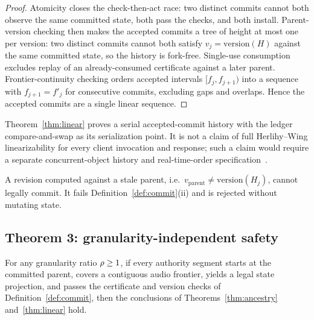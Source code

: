\begin{proof}
Atomicity closes the check-then-act race: two distinct commits cannot both
observe the same committed state, both pass the checks, and both install.
Parent-version checking then makes the accepted commits a tree of height at
most one per version: two distinct commits cannot both satisfy
$v_j = \mathrm{version}(H)$ against the same committed state, so the
history is fork-free. Single-use consumption excludes replay of an
already-consumed certificate against a later parent. Frontier-continuity
checking orders accepted intervals $[f_j,f_{j+1})$ into a sequence with
$f_{j+1} = f'_{j}$ for consecutive commits, excluding gaps and overlaps.
Hence the accepted commits are a single linear sequence.
\end{proof}

\begin{remark}\label{rem:not-linearizable}
Theorem~\ref{thm:linear} proves a serial accepted-commit history with the
ledger compare-and-swap as its serialization point. It is not a claim of
full Herlihy--Wing linearizability for every client invocation and response;
such a claim would require a separate concurrent-object history and
real-time-order specification~\cite{herlihy1990linearizability}.
\end{remark}

\begin{corollary}\label{cor:stale}
A revision computed against a stale parent, i.e.\
$v_{\mathrm{parent}} \neq \mathrm{version}(H_j)$, cannot legally commit.
It fails Definition~\ref{def:commit}(ii) and is rejected without mutating
state.
\end{corollary}

\subsection{Theorem 3: granularity-independent safety}\label{sec:dgft:thm3}

\begin{theorem}\label{thm:gran}
For any granularity ratio $\rho \ge 1$, if every authority segment
starts at the committed parent, covers a contiguous audio frontier, yields a
legal state projection, and passes the certificate and version checks of
Definition~\ref{def:commit}, then the conclusions of
Theorems~\ref{thm:ancestry} and~\ref{thm:linear} hold.
\end{theorem}

